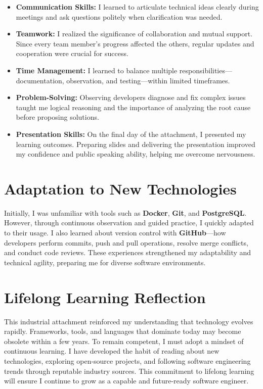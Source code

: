 \documentclass[12pt,a4paper]{report}
\newenvironment{coloritemize}
{\begin{itemize}[label=\textcolor{primaryblue}{$\bullet$}]}
{\end{itemize}}
\begin{document}
\begin{coloritemize}
    \item \textcolor{secondaryblue}{\textbf{Communication Skills:}} I learned to articulate technical ideas clearly during meetings and ask questions politely when clarification was needed.
    
    \item \textcolor{secondaryblue}{\textbf{Teamwork:}} I realized the significance of collaboration and mutual support. Since every team member’s progress affected the others, regular updates and cooperation were crucial for success.
    
    \item \textcolor{secondaryblue}{\textbf{Time Management:}} I learned to balance multiple responsibilities—documentation, observation, and testing—within limited timeframes.
    
    \item \textcolor{secondaryblue}{\textbf{Problem-Solving:}} Observing developers diagnose and fix complex issues taught me logical reasoning and the importance of analyzing the root cause before proposing solutions.
    
    \item \textcolor{secondaryblue}{\textbf{Presentation Skills:}} On the final day of the attachment, I presented my learning outcomes. Preparing slides and delivering the presentation improved my confidence and public speaking ability, helping me overcome nervousness.
\end{coloritemize}

\section{Adaptation to New Technologies}
Initially, I was unfamiliar with tools such as \textbf{Docker}, \textbf{Git}, and \textbf{PostgreSQL}. However, through continuous observation and guided practice, I quickly adapted to their usage. I also learned about version control with \textbf{GitHub}—how developers perform commits, push and pull operations, resolve merge conflicts, and conduct code reviews. These experiences strengthened my adaptability and technical agility, preparing me for diverse software environments.

\section{Lifelong Learning Reflection}
This industrial attachment reinforced my understanding that technology evolves rapidly. Frameworks, tools, and languages that dominate today may become obsolete within a few years. To remain competent, I must adopt a mindset of continuous learning. I have developed the habit of reading about new technologies, exploring open-source projects, and following software engineering trends through reputable industry sources. This commitment to lifelong learning will ensure I continue to grow as a capable and future-ready software engineer.
\end{document}

